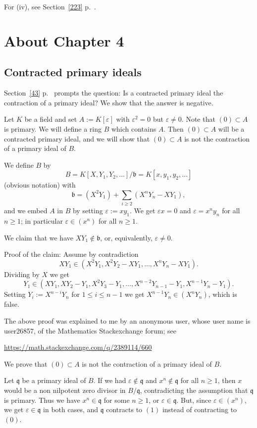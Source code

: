 \documentclass[parskip=half,fontsize=12pt]{scrartcl}%
\begin{document}
For (iv), see Section~\ref{223} p.~\pageref{223}.

\section{About Chapter 4}%

\subsection{Contracted primary ideals}\label{cpi}%

Section~\ref{43} p.~\pageref{43} prompts the question: Is a contracted primary ideal the contraction of a primary ideal? We show that the answer is negative.

Let $K$ be a field and set $A:=K[\varepsilon]$ with $\varepsilon^2=0$ but $\varepsilon\ne0$. Note that $(0)\subset A$ is primary. We will define a ring $B$ which contains $A$. Then $(0)\subset A$ will be a contracted primary ideal, and we will show that $(0)\subset A$ is not the contraction of a primary ideal of $B$. 

We define $B$ by 
$$
B=K[X,Y_1,Y_2,\dots]/\mathfrak b=K[x,y_1,y_2,\dots]
$$ 
(obvious notation) with 
$$
\mathfrak b=(X^2Y_1)+\sum_{i\ge2}(X^nY_n-XY_1),
$$
and we embed $A$ in $B$ by setting $\varepsilon:=xy_1$. We get $\varepsilon x=0$ and $\varepsilon=x^ny_n$ for all $n\ge1$; in particular $\varepsilon\in(x^n)$ for all $n\ge1$.

We claim that we have $XY_1\notin\mathfrak b$, or, equivalently, $\varepsilon\ne0$.

Proof of the claim: Assume by contradiction 
$$
XY_1\in(X^2Y_1,X^2Y_2-XY_1,\dots,X^nY_n-XY_1).
$$ 
Dividing by $X$ we get 
$$
Y_1\in(XY_1,XY_2-Y_1,X^2Y_3-Y_1,\dots,X^{n-2}Y_{n-1}-Y_1,X^{n-1}Y_n-Y_1).
$$ 
Setting $Y_i:=X^{n-i}Y_n$ for $1\le i\le n-1$ we get $X^{n-1}Y_n\in(X^nY_n)$, which is false. 

The above proof was explained to me by an anonymous user, whose user name is user26857, of the Mathematics Stackexchange forum; see 

\href{https://math.stackexchange.com/q/2389114/660}{https://math.stackexchange.com/q/2389114/660}

We prove that $(0)\subset A$ is not the contraction of a primary ideal of $B$.

Let $\mathfrak q$ be a primary ideal of $B$. If we had $\varepsilon\notin\mathfrak q$ and $x^n\notin\mathfrak q$ for all $n\ge1$, then $x$ would be a non nilpotent zero divisor in $B/\mathfrak q$, contradicting the assumption that $\mathfrak q$ is primary. Thus we have $x^n\in\mathfrak q$ for some $n\ge1$, or $\varepsilon\in\mathfrak q$. But, since $\varepsilon\in(x^n)$, we get $\varepsilon\in\mathfrak q$ in both cases, and $\mathfrak q$ contracts to $(1)$ instead of contracting to $(0)$.
\end{document}
